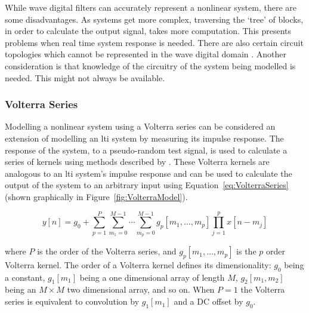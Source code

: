 			While wave digital filters can accurately represent a nonlinear system, there are some
			disadvantages. As systems get more complex, traversing the `tree' of blocks, in order to calculate
			the output signal, takes more computation. This presents problems when real time system response is
			needed. There are also certain circuit topologies which cannot be represented in the wave digital
			domain \citep{valimaki2011virtual}. Another consideration is that knowledge of the circuitry of the
			system being modelled is needed. This might not always be available.

		\subsubsection{Volterra Series}
			Modelling a nonlinear system using a Volterra series can be considered an extension of modelling an
			\acrshort{lti} system by measuring its impulse response. The response of the system, to a
			pseudo-random test signal, is used to calculate a series of kernels using methods described by
			\citet{schetzen1980the}.  These Volterra kernels are analogous to an \acrshort{lti} system's
			impulse response and can be used to calculate the output of the system to an arbitrary input using
			Equation~\ref{eq:VolterraSeries} (shown graphically in Figure~\ref{fig:VolterraModel}).

			\begin{equation}
				y[n] = g_{0} + \sum_{p = 1}^{P} 
					\sum_{m_{1} = 0}^{M - 1} \dotsi \sum_{m_{p} = 0}^{M - 1}
					g_{p}[m_{1}, \dotsc , m_{p}]
					\prod_{j = 1}^{p} x[n - m_{j}]
				\label{eq:VolterraSeries}
			\end{equation}

			where $P$ is the order of the Volterra series, and $g_{p}[m_{1}, \dotsc , m_{p}]$ is the
			$p$ order Volterra kernel. The order of a Volterra kernel defines its dimensionality:
			$g_{0}$ being a constant, $g_{1}[m_{1}]$ being a one dimensional array of length $M$, $g_{2}[m_{1},
			m_{2}]$ being an $M \times M$ two dimensional array, and so on. When $P = 1$ the Volterra series is
			equivalent to convolution by $g_{1}[m_{1}]$ and a DC offset by $g_{0}$.

